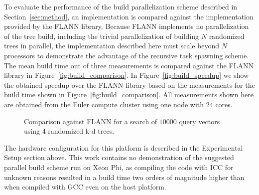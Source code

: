    To evaluate the performance of the build 
  parallelization scheme described in Section~\ref{sec:method}, an 
  implementation is compared against the implementation provided by the FLANN 
  library. Because FLANN implements no parallelization of the tree build, 
  including the trivial parallelization of building $N$ randomized trees in 
  parallel, the implementation described here must scale beyond $N$ processors 
  to demonstrate the advantage of the recursive task
  spawning scheme.  The mean build time out of three measurements is compared 
  against the FLANN library in Figure~\ref{fig:build_comparison}.
  In Figure~\ref{fig:build_speedup} we show the obtained speedup over the FLANN 
  library based on the measurements for the build time shown in 
  Figure~\ref{fig:build_comparison}.  All measurements shown here are obtained 
  from the Euler compute cluster using one node with $24$ cores.
  \begin{figure}[tb]
    \centering
    \resizebox{\columnwidth}{!}{}
    \caption{Comparison against FLANN for a search of $10000$ query vectors 
    using $4$ randomized k-d trees.}
    \label{fig:search_comparison}
  \end{figure}
  The hardware configuration for this platform is described in the Experimental 
  Setup section above.  This work contains no demonstration of the suggested 
  parallel build scheme run on Xeon Phi, as compiling the code with ICC for 
  unknown reasons resulted in a build time two orders of magnitude higher than 
  when compiled with GCC even on the host platform.

